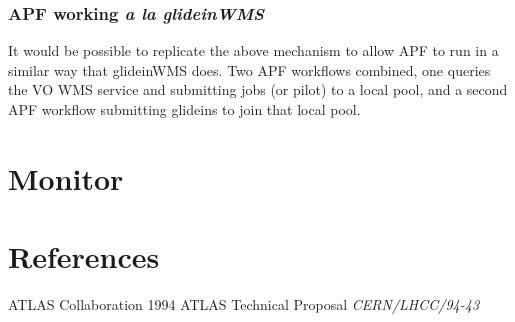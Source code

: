 \documentclass[a4paper]{jpconf}
\begin{document}
\subsubsection{APF working \emph{a la glideinWMS}}

It would be possible to replicate the above mechanism to allow APF to run in a similar way that glideinWMS does. 
Two APF workflows combined, one queries the VO WMS service and submitting jobs (or pilot) to a local pool, 
and a second APF workflow submitting glideins to join that local pool. 

\section{Monitor}



\section*{References}
\begin{thebibliography}{99}


\item ATLAS Collaboration 1994 ATLAS Technical Proposal 
      {\it CERN/LHCC/94-43} 

\end{thebibliography}

~

\end{document}
